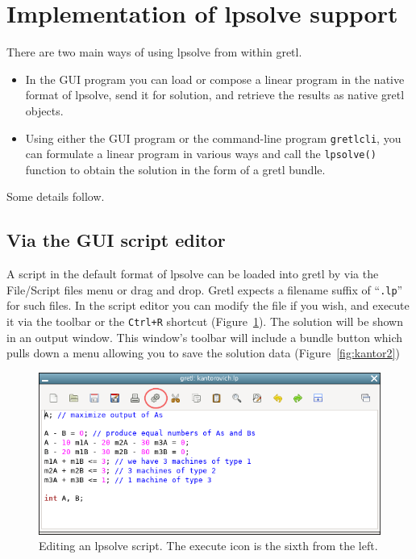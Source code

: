 \documentclass{article}
\begin{document}
\section{Implementation of lpsolve support}
\label{sec:implement}

There are two main ways of using \textsf{lpsolve} from within gretl.
\begin{itemize}
\item In the GUI program you can load or compose a linear program in
  the native format of \textsf{lpsolve}, send it for solution, and
  retrieve the results as native gretl objects.
\item Using either the GUI program or the command-line program
  \texttt{gretlcli}, you can formulate a linear program in various
  ways and call the \texttt{lpsolve()} function to obtain the solution
  in the form of a gretl bundle.
\end{itemize}

Some details follow.

\subsection{Via the GUI script editor}

A script in the default format of \textsf{lpsolve} can be loaded into
gretl by via the \textsf{File/Script files} menu or drag and drop.
Gretl expects a filename suffix of ``\texttt{.lp}'' for such files.
In the script editor you can modify the file if you wish, and execute
it via the toolbar or the \texttt{Ctrl+R} shortcut
(Figure~\ref{fig:kantor1}). The solution will be shown in an output
window. This window's toolbar will include a bundle button which pulls
down a menu allowing you to save the solution data
(Figure~\ref{fig:kantor2})

\begin{figure}[p]
  \centering
  \includegraphics[scale=0.7]{figures/kantor-edit}
  \caption{Editing an \textsf{lpsolve} script. The execute icon is the
    sixth from the left.}
  \label{fig:kantor1}
\end{figure}
\end{document}
